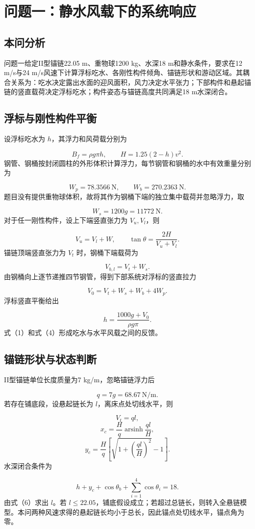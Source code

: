 \section{问题一：静水风载下的系统响应}
\subsection{本问分析}
问题一给定II型锚链22.05 m、重物球1200 kg、水深18 m和静水条件，要求在12 m/s与24 m/s风速下计算浮标吃水、各刚性构件倾角、锚链形状和游动区域。其耦合关系为：吃水决定露出水面的迎风面积，风力决定水平张力；下部构件和悬起锚链的竖直载荷决定浮标吃水；构件姿态与锚链高度共同满足18 m水深闭合。

\subsection{浮标与刚性构件平衡}
设浮标吃水为 \(h\)，其浮力和风荷载分别为

\[
B_f=\rho g\pi h,
\qquad
H=1.25(2-h)v^2. \tag{1}
\]
钢管、钢桶按封闭圆柱的外形体积计算浮力，每节钢管和钢桶的水中有效重量分别为

\[
W_p=78.3566\ \mathrm N,
\qquad W_b=270.2363\ \mathrm N.
\]
题目没有提供重物球体积，故将其作为钢桶下端的独立集中载荷并忽略浮力，取

\[
W_s=1200g=11772\ \mathrm N.
\]
对于任一刚性构件，设上下端竖直张力为 \(V_u,V_l\)，则

\[
V_u=V_l+W,
\qquad
\tan\theta=\frac{2H}{V_u+V_l}. \tag{2}
\]
锚链顶端竖直张力为 \(V_t\) 时，钢桶下端载荷为

\[
V_{b,l}=V_t+W_s.
\]
由钢桶向上逐节递推四节钢管，得到下部系统对浮标的竖直拉力

\[
V_0=V_t+W_s+W_b+4W_p. \tag{3}
\]
浮标竖直平衡给出

\[
h=\frac{1000g+V_0}{\rho g\pi}. \tag{4}
\]
式（1）和式（4）形成吃水与水平风载之间的反馈。

\subsection{锚链形状与状态判断}
II型锚链单位长度质量为7 kg/m，忽略锚链浮力后

\[
q=7g=68.67\ \mathrm{N/m}.
\]
若存在铺底段，设悬起链长为 \(l\)，离床点处切线水平，则

\[
V_t=ql,
\]
\[
x_c=\frac{H}{q}\operatorname{arsinh}\frac{ql}{H},
\]
\[
y_c=\frac{H}{q}
\left[
\sqrt{1+\left(\frac{ql}{H}\right)^2}-1
\right]. \tag{5}
\]
水深闭合条件为

\[
h+y_c+\cos\theta_b+
\sum_{i=1}^{4}\cos\theta_i=18. \tag{6}
\]
由式（6）求出 \(l\)。若 \(l\le22.05\)，铺底假设成立；若超过总链长，则转入全悬链模型。本问两种风速求得的悬起链长均小于总长，因此锚点处切线水平，锚点角为零。

